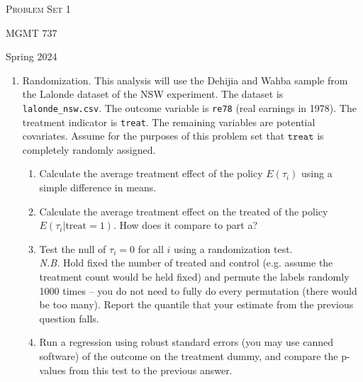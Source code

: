 \documentclass[11pt, a4paper]{article}
\begin{document}
\begin{center}
  {\Large \textsc{Problem Set 1}}

  MGMT 737
\end{center}
\begin{center}
  Spring 2024
\end{center}

\begin{enumerate}
\item Randomization. This analysis will use the Dehijia
  and Wahba sample from the Lalonde dataset of the NSW experiment. The dataset is
  \texttt{lalonde\_nsw.csv}. The outcome variable is \texttt{re78}
  (real earnings in 1978). The treatment indicator is
  \texttt{treat}. The remaining variables are potential covariates. Assume for the purposes of this problem set that $\texttt{treat}$ is completely randomly assigned. 
  \begin{enumerate}
  \item Calculate the average treatment effect of the policy
    $E(\tau_{i})$ using a simple difference in means.
  \item Calculate the average treatment effect on the treated of the policy
    $E(\tau_{i}| \mathrm{treat} = 1)$. How does it compare to part a? 
  \item Test the null of $\tau_{i} = 0$ for all $i$ using a
    randomization test. \\
    \emph{N.B.} Hold fixed the number of treated and control
    (e.g. assume the treatment count would be held fixed) and permute
    the labels randomly 1000 times -- you do not need to fully do
    every permutation (there would be too many). Report the quantile
    that your estimate from the previous question falls.
  \item Run a regression using robust standard errors (you may use
    canned software) of the outcome on the treatment dummy, and
    compare the p-values from this test to the previous answer.
  \end{enumerate}  
\end{enumerate}
\end{document}
